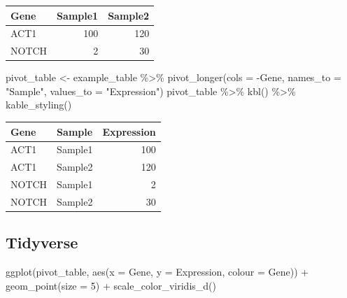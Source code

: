 \documentclass[
  letterpaper,
  DIV=11,
  numbers=noendperiod,
  landscape]{scrartcl}
\newenvironment{Shaded}{\begin{snugshade}}{\end{snugshade}}
\newcommand{\AttributeTok}[1]{\textcolor[rgb]{0.40,0.45,0.13}{#1}}
\newcommand{\DecValTok}[1]{\textcolor[rgb]{0.68,0.00,0.00}{#1}}
\newcommand{\FunctionTok}[1]{\textcolor[rgb]{0.28,0.35,0.67}{#1}}
\newcommand{\NormalTok}[1]{\textcolor[rgb]{0.00,0.23,0.31}{#1}}
\newcommand{\OtherTok}[1]{\textcolor[rgb]{0.00,0.23,0.31}{#1}}
\newcommand{\SpecialCharTok}[1]{\textcolor[rgb]{0.37,0.37,0.37}{#1}}
\newcommand{\StringTok}[1]{\textcolor[rgb]{0.13,0.47,0.30}{#1}}
\begin{document}
\begin{table}
\centering
\begin{tabular}[t]{l|r|r}
\hline
Gene & Sample1 & Sample2\\
\hline
ACT1 & 100 & 120\\
\hline
NOTCH & 2 & 30\\
\hline
\end{tabular}
\end{table}

\begin{Shaded}
\begin{Highlighting}[]
\NormalTok{pivot\_table }\OtherTok{\textless{}{-}}\NormalTok{ example\_table }\SpecialCharTok{\%\textgreater{}\%} \FunctionTok{pivot\_longer}\NormalTok{(}\AttributeTok{cols =} \SpecialCharTok{{-}}\NormalTok{Gene, }\AttributeTok{names\_to =} \StringTok{"Sample"}\NormalTok{, }\AttributeTok{values\_to =} \StringTok{"Expression"}\NormalTok{)}
\NormalTok{pivot\_table }\SpecialCharTok{\%\textgreater{}\%}
  \FunctionTok{kbl}\NormalTok{() }\SpecialCharTok{\%\textgreater{}\%}
  \FunctionTok{kable\_styling}\NormalTok{()}
\end{Highlighting}
\end{Shaded}

\begin{table}
\centering
\begin{tabular}[t]{l|l|r}
\hline
Gene & Sample & Expression\\
\hline
ACT1 & Sample1 & 100\\
\hline
ACT1 & Sample2 & 120\\
\hline
NOTCH & Sample1 & 2\\
\hline
NOTCH & Sample2 & 30\\
\hline
\end{tabular}
\end{table}

\hypertarget{tidyverse-3}{%
\subsection{Tidyverse}\label{tidyverse-3}}

\begin{Shaded}
\begin{Highlighting}[]
\FunctionTok{ggplot}\NormalTok{(pivot\_table, }\FunctionTok{aes}\NormalTok{(}\AttributeTok{x =}\NormalTok{ Gene, }\AttributeTok{y =}\NormalTok{ Expression, }\AttributeTok{colour =}\NormalTok{ Gene)) }\SpecialCharTok{+}
  \FunctionTok{geom\_point}\NormalTok{(}\AttributeTok{size =} \DecValTok{5}\NormalTok{) }\SpecialCharTok{+}
  \FunctionTok{scale\_color\_viridis\_d}\NormalTok{()}
\end{Highlighting}
\end{Shaded}
\end{document}
